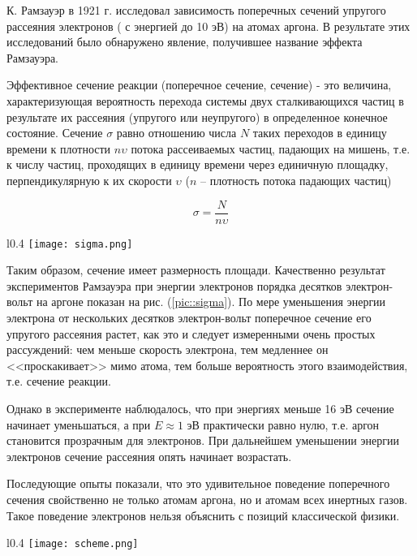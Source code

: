 К. Рамзауэр в 1921 г. исследовал зависимость поперечных сечений упругого
рассеяния электронов ( с энергией до 10 эВ) на атомах аргона. В результате этих
исследований было обнаружено явление, получившее название эффекта Рамзауэра.

Эффективное сечение реакции (поперечное сечение, сечение) - это величина,
характеризующая вероятность перехода системы двух сталкивающихся частиц в
результате их рассеяния (упругого или неупругого) в определенное конечное
состояние. Сечение $\sigma$ равно отношению числа $N$ таких переходов в единицу
времени к плотности $n \upsilon$ потока рассеиваемых частиц, падающих на мишень,
т.е. к числу частиц, проходящих в единицу времени через единичную площадку,
перпендикулярную к их скорости $\upsilon$ ($n$ -- плотность потока падающих
частиц)

\begin{equation} \label{sigma}
  \sigma = \frac{N}{n \upsilon}
\end{equation}


\begin{wrapfigure}[14]{l}{0.4\linewidth}
  \texttt{[image: sigma.png]}
  \label{pic::sigma}
  \caption{Качественная картина результатов измерения упругого рассеяния
  электронов в аргоне}
\end{wrapfigure}

Таким образом, сечение имеет размерность площади.
Качественно результат экспериментов Рамзауэра при энергии электронов порядка
десятков электрон-вольт на аргоне показан на рис. (\ref{pic::sigma}). По мере
уменьшения энергии электрона от нескольких десятков электрон-вольт поперечное
сечение его упругого рассеяния растет, как это и следует измеренными очень простых
рассуждений: чем меньше скорость электрона, тем медленнее он <<проскакивает>>
мимо атома, тем больше вероятность этого взаимодействия, т.е. сечение реакции.

Однако в эксперименте наблюдалось, что при энергиях меньше 16 эВ сечение
начинает уменьшаться, а при $E \approx 1$ эВ практически равно нулю, т.е. аргон
становится прозрачным для электронов. При дальнейшем уменьшении энергии
электронов сечение рассеяния опять начинает возрастать.

Последующие опыты показали, что это удивительное поведение поперечного сечения
свойственно не только атомам аргона, но и атомам всех инертных газов. Такое
поведение электронов нельзя объяснить с позиций классической физики.

\begin{wrapfigure}[13]{l}{0.4\linewidth}
  \texttt{[image: scheme.png]}
  \caption{Схема установки для измерения сечения рассеяния электронов в газах}
  \label{pic::scheme}
\end{wrapfigure}

